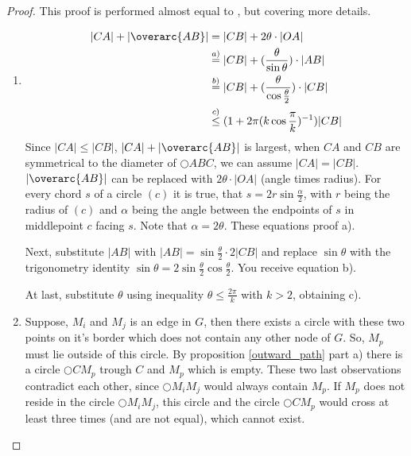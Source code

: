 \begin{proof}
This proof is performed almost equal to \cite{kanj}, but covering more details.
\renewcommand{\labelenumi}{(\roman{enumi})}%
\begin{enumerate}
\item 
\begin{equation*}
\begin{split}
|CA|+|\overarc{AB}| &= |CB| + 2\theta \cdot |OA| \\
&\stackrel{a)}{=}|CB| + (\frac{\theta}{\sin{\theta}})\cdot |AB| \\
&\stackrel{b)}{=} |CB| + (\frac{\theta}{\cos{\frac{\theta}{2}}}) \cdot |CB|\\
&\stackrel{c)}{\leq} (1+2\pi(k \cos{\frac{\pi}{k}})^{-1}) |CB|  
\end{split}
\end{equation*}
Since $|CA| \leq |CB| $, $|CA|+|\overarc{AB}| $ is largest, when $CA $ and $CB $ are symmetrical to the diameter of $\bigcirc{ABC} $, we can assume $|CA|=|CB| $.
$|\overarc{AB}| $ can be replaced with $2\theta \cdot |OA| $ (angle times radius).
For every chord $s $ of a circle $(c) $ it is true, that $s=2r\sin{\frac{\alpha}{2}} $, with $r $ being the radius of $(c) $ and $\alpha $ being the angle between the endpoints of $s $ in middlepoint $c $ facing $s $.
Note that $\alpha = 2\theta $. 
These equations proof a).

Next, substitute $|AB| $ with $|AB| = \sin{\frac{\theta}{2}} \cdot 2|CB| $ and replace $\sin{\theta} $ with the trigonometry identity $\sin{\theta}=2\sin{\frac{\theta}{2}} \cos{\frac{\theta}{2}} $.
You receive equation b).

At last, substitute $\theta $ using inequality $\theta \leq \frac{2\pi}{k} $ with $k > 2 $, obtaining c).

\item  Suppose, $M_i $ and $M_j $ is an edge in $G $, then there exists a circle with these two points on it's border which does not contain any other node of $G $.
So, $M_p $ must lie outside of this circle.
By proposition \ref{outward_path} part a) there is a circle $\bigcirc{CM_p} $ trough $C $ and $M_p $ which is empty.
These two last observations contradict each other, since $\bigcirc{M_iM_j} $ would always contain $M_p $.
If $M_p $ does not reside in the circle $\bigcirc{M_iM_j} $, this circle and the circle $\bigcirc{CM_p} $ would cross at least three times (and are not equal), which cannot exist.


\end{enumerate}
\end{proof}
